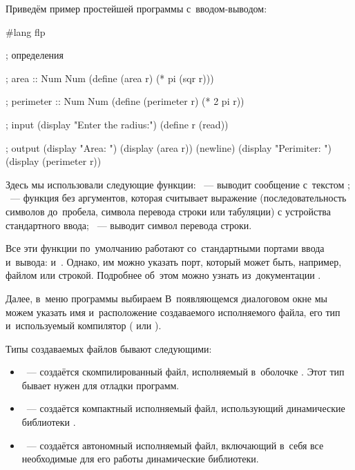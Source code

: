 Приведём пример простейшей программы с~вводом-выводом:
\begin{Definition}[emph={r}]
#lang flp

; определения

; area :: Num \arrow Num
(define (area r)
  (* pi (sqr r)))

; perimeter :: Num \arrow Num
(define (perimeter r)
  (* 2 pi r))


; input
(display "Enter the radius:")
(define r (read))

; output
(display "Area: ")
(display (area r))
(newline)
(display "Perimiter: ")
(display (perimeter r))
\end{Definition}


Здесь мы использовали следующие функции: ~--- выводит сообщение с~текстом ; ~--- функция без аргументов, которая считывает выражение (последовательность символов до~пробела, символа перевода строки или табуляции) с устройства стандартного ввода; ~--- выводит символ перевода строки.

Все эти функции по~умолчанию работают со~стандартными портами ввода и~вывода:  и~. Однако, им можно указать порт, который может быть, например, файлом или строкой. Подробнее об~этом можно узнать из~документации .

Далее, в~меню программы  выбираем  В~появляющемся диалоговом окне мы можем указать имя и~расположение создаваемого исполняемого файла, его тип и~используемый компилятор ( или ).

Типы создаваемых файлов бывают следующими:

\begin{itemize}[--]
 \item {}~--- создаётся скомпилированный файл, исполняемый в~оболочке . Этот тип бывает нужен для отладки программ.

 \item {}~--- создаётся компактный исполняемый файл, использующий динамические библиотеки .

 \item {}~--- создаётся автономный исполняемый файл, включающий в~себя все необходимые для его работы динамические библиотеки.
\end{itemize}

